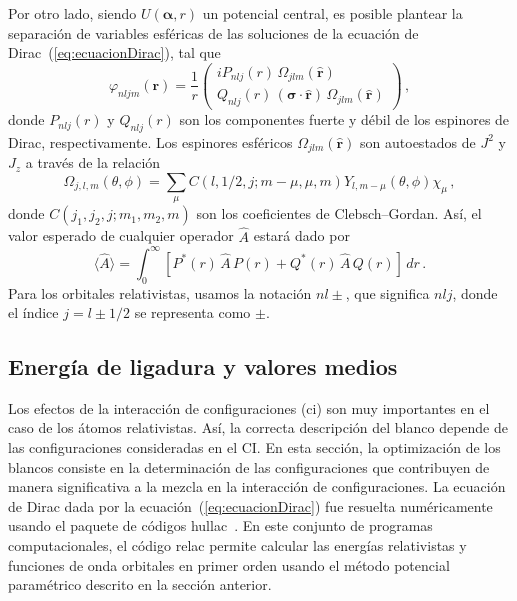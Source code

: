Por otro lado, siendo $U(\boldsymbol{\alpha},r)$ un potencial central,
es posible plantear la separación de variables esféricas de las 
soluciones de la ecuación de Dirac~(\ref{eq:ecuacionDirac}), tal que
\begin{equation}
\varphi_{nljm}(\mathbf{r}) = \frac{1}{r} \left( 
\begin{array}{c}
i P_{nlj}(r) \,\Omega_{jlm}(\hat{\mathbf{r}}) \\ 
  Q_{nlj}(r) \,(\boldsymbol{\sigma}\cdot\hat{\mathbf{r}})\,\Omega_{jlm}(\hat{\mathbf{r}})
\end{array}
\right)\,,
\label{eq:sepespinor}
\end{equation}
donde $P_{nlj}(r)$ y $Q_{nlj}(r)$ son los componentes fuerte y débil de los 
espinores de Dirac, respectivamente. Los espinores esféricos 
$\Omega_{jlm}(\hat{\mathbf{r}})$ son autoestados de $J^2$ y $J_z$ a 
través de la relación
\begin{equation}
\Omega_{j, l, m}(\theta, \phi)=\sum_{\mu} C(l, 1 / 2, j ; m-\mu, \mu, m) Y_{l, m-\mu}(\theta, \phi) \chi_{\mu}\,,
\end{equation}
donde $C\left(j_{1}, j_{2}, j ; m_{1}, m_{2}, m\right)$ son los
coeficientes de Clebsch--Gordan. Así, el valor esperado de cualquier 
operador $\hat{A}$ estará dado por
\begin{equation}
\langle\hat{A}\rangle=\int_0^{\infty}\left[P^*(r)\,\hat{A}\,P(r) 
 +Q^*(r)\,\hat{A}\,Q(r)
\right]\,dr\,.
\label{eq:meanvalr}
\end{equation}
Para los orbitales relativistas, usamos la notación $nl\pm$, que 
significa $nlj$, donde el índice $j=l\pm1/2$ se representa como $\pm$.

\subsection{Energía de ligadura y valores medios}

Los efectos de la interacción de configuraciones (\acs{ci}) son muy 
importantes en el caso de los átomos relativistas. Así, la correcta 
descripción del blanco depende de las configuraciones consideradas en 
el CI. En esta sección, la optimización de los blancos consiste en la 
determinación de las configuraciones que contribuyen de manera 
significativa a la mezcla en la interacción de configuraciones. 
La ecuación de Dirac dada por la ecuación~(\ref{eq:ecuacionDirac}) fue 
resuelta numéricamente usando el paquete de códigos 
{\sc hullac}~\cite{BarShalom:01}. En este conjunto de programas 
computacionales, el código {\sc relac} permite calcular las energías 
relativistas y funciones de onda orbitales en primer orden usando el 
método potencial paramétrico descrito en la sección anterior. 

